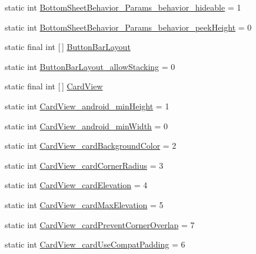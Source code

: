 \begin{DoxyCompactItemize}
\item 
static int \hyperlink{classandroid_1_1support_1_1design_1_1R_1_1styleable_a187697693b30aa7a837dcfc348a3e86f}{Bottom\+Sheet\+Behavior\+\_\+\+Params\+\_\+behavior\+\_\+hideable} = 1
\item 
static int \hyperlink{classandroid_1_1support_1_1design_1_1R_1_1styleable_a32c296d23574cb4ecb2698c4645bbbd9}{Bottom\+Sheet\+Behavior\+\_\+\+Params\+\_\+behavior\+\_\+peek\+Height} = 0
\item 
static final int \mbox{[}$\,$\mbox{]} \hyperlink{classandroid_1_1support_1_1design_1_1R_1_1styleable_a4f0d1f5f070f55c0bbcd76e065dda963}{Button\+Bar\+Layout}
\item 
static int \hyperlink{classandroid_1_1support_1_1design_1_1R_1_1styleable_a0ccf3237d7fd785321610e6dcf8584ea}{Button\+Bar\+Layout\+\_\+allow\+Stacking} = 0
\item 
static final int \mbox{[}$\,$\mbox{]} \hyperlink{classandroid_1_1support_1_1design_1_1R_1_1styleable_a56025691fb136d28dc5fce5a25d7c65e}{Card\+View}
\item 
static int \hyperlink{classandroid_1_1support_1_1design_1_1R_1_1styleable_aaa46b03e98d9719634ae097f8034a87a}{Card\+View\+\_\+android\+\_\+min\+Height} = 1
\item 
static int \hyperlink{classandroid_1_1support_1_1design_1_1R_1_1styleable_a7cd46aef2821766fc2a2f791147bfa8b}{Card\+View\+\_\+android\+\_\+min\+Width} = 0
\item 
static int \hyperlink{classandroid_1_1support_1_1design_1_1R_1_1styleable_a981ca74979c85ed8524c9ac8a8be63a6}{Card\+View\+\_\+card\+Background\+Color} = 2
\item 
static int \hyperlink{classandroid_1_1support_1_1design_1_1R_1_1styleable_a56013ce0ae69336c7d1e0f3c38902e3f}{Card\+View\+\_\+card\+Corner\+Radius} = 3
\item 
static int \hyperlink{classandroid_1_1support_1_1design_1_1R_1_1styleable_ab1f403337584c00422841622610e14b3}{Card\+View\+\_\+card\+Elevation} = 4
\item 
static int \hyperlink{classandroid_1_1support_1_1design_1_1R_1_1styleable_ab9004c87f60e622b9d923cc5c6a6a276}{Card\+View\+\_\+card\+Max\+Elevation} = 5
\item 
static int \hyperlink{classandroid_1_1support_1_1design_1_1R_1_1styleable_af6467363197508f4dffe4ce79959a4e7}{Card\+View\+\_\+card\+Prevent\+Corner\+Overlap} = 7
\item 
static int \hyperlink{classandroid_1_1support_1_1design_1_1R_1_1styleable_a6d33db49497d7e18a8bf8487f8d988b5}{Card\+View\+\_\+card\+Use\+Compat\+Padding} = 6

\end{DoxyCompactItemize}
